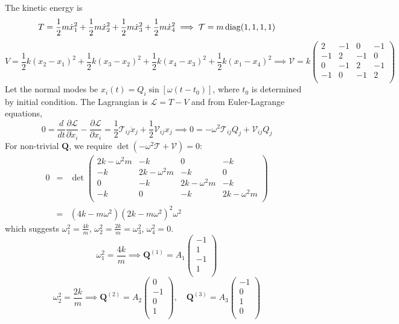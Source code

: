 \documentclass[a4paper]{article}
\begin{document}
\begin{ans}
The kinetic energy is
$$T=\frac{1}{2}m\dot{x}_1^2+\frac{1}{2}m\dot{x}_2^2+\frac{1}{2}m\dot{x}_3^2+\frac{1}{2}m\dot{x}_4^2\implies \mathcal{T}=m\operatorname{diag}(1,1,1,1)$$
$$V=\frac{1}{2}k(x_2-x_1)^2+\frac{1}{2}k(x_3-x_2)^2+\frac{1}{2}k(x_4-x_3)^2+\frac{1}{2}k(x_1-x_4)^2\implies\mathcal{V}=k\begin{pmatrix}2&-1&0&-1\\-1&2&-1&0\\0&-1&2&-1\\-1&0&-1&2\\\end{pmatrix}$$
Let the normal modes be $x_i(t)=Q_i\sin[\omega(t-t_0)]$, where $t_0$ is determined by initial condition. The Lagrangian is $\mathcal{L}=T-V$ and from Euler-Lagrange equations,
$$0=\frac{d}{dt}\frac{\partial\mathcal{L}}{\partial\dot{x}_i}-\frac{\partial\mathcal{L}}{\partial x_i}=\frac{1}{2}\mathcal{T}_{ij}\ddot{x}_j+\frac{1}{2}\mathcal{V}_{ij}x_j\implies 0=-\omega^2\mathcal{T}_{ij}Q_j+\mathcal{V}_{ij}Q_j$$
For non-trivial $\mathbf{Q}$, we require $\det(-\omega^2\mathcal{T}+\mathcal{V})=0$:
\begin{eqnarray}
0&=&\det\begin{pmatrix}2k-\omega^2m&-k&0&-k\\-k&2k-\omega^2m&-k&0\\0&-k&2k-\omega^2m&-k\\-k&0&-k&2k-\omega^2m\\\end{pmatrix}\nonumber\\&=&(4k-m\omega^2)(2k-m\omega^2)^2\omega^2\nonumber
\end{eqnarray}
which suggests $\omega_1^2=\frac{4k}{m}$, $\omega_2^2=\frac{2k}{m}=\omega_3^2$, $\omega_4^2=0$.
$$\omega_1^2=\frac{4k}{m}\implies\mathbf{Q}^{(1)}=A_1\begin{pmatrix}-1\\1\\-1\\1\\\end{pmatrix}$$
$$\omega_2^2=\frac{2k}{m}\implies\mathbf{Q}^{(2)}=A_2\begin{pmatrix}0\\-1\\0\\1\\\end{pmatrix},\quad \mathbf{Q}^{(3)}=A_3\begin{pmatrix}-1\\0\\1\\0\\\end{pmatrix}$$

\end{ans}
\end{document}

